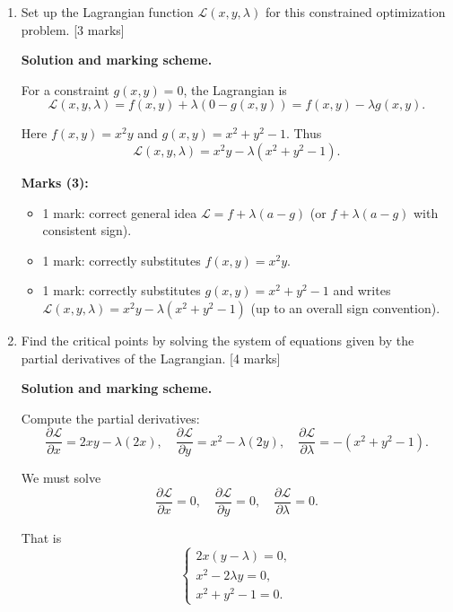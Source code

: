 \documentclass{article}
\begin{document}
\begin{enumerate}[label=(\alph*)]
    \item Set up the Lagrangian function $\mathcal{L}(x,y,\lambda)$ for this constrained optimization problem. [3 marks]

    \begin{mdframed}[linecolor=black, linewidth=1pt]
    \textbf{Solution and marking scheme.}

    For a constraint $g(x,y)=0$, the Lagrangian is
    \[
    \mathcal{L}(x,y,\lambda) = f(x,y) + \lambda (0 - g(x,y)) =  f(x,y) -\lambda g(x,y).
    \]
    
    Here $f(x,y)=x^2y$ and $g(x,y)=x^2+y^2-1$. Thus
    \[
    \mathcal{L}(x,y,\lambda)
    = x^2y - \lambda(x^2 + y^2 - 1).
    \]
    
    \textbf{Marks (3):}
    \begin{itemize}
      \item 1 mark: correct general idea $\mathcal{L}=f+\lambda(a-g)$ (or $f+\lambda(a-g)$ with consistent sign).
      \item 1 mark: correctly substitutes $f(x,y)=x^2y$.
      \item 1 mark: correctly substitutes $g(x,y)=x^2+y^2-1$ and writes $\mathcal{L}(x,y,\lambda)=x^2y-\lambda(x^2+y^2-1)$ (up to an overall sign convention).
    \end{itemize}
    \end{mdframed}

    \item Find the critical points by solving the system of equations given by the partial derivatives of the Lagrangian. [4 marks]

    \begin{mdframed}[linecolor=black, linewidth=1pt]
    \textbf{Solution and marking scheme.}

    Compute the partial derivatives:
    \[
    \frac{\partial\mathcal{L}}{\partial x}
    = 2xy - \lambda(2x),
    \quad
    \frac{\partial\mathcal{L}}{\partial y}
    = x^2 - \lambda(2y),
    \quad
    \frac{\partial\mathcal{L}}{\partial\lambda}
    = -(x^2 + y^2 -1).
    \]
    
    We must solve
    \[
    \frac{\partial\mathcal{L}}{\partial x}=0,\quad
    \frac{\partial\mathcal{L}}{\partial y}=0,\quad
    \frac{\partial\mathcal{L}}{\partial\lambda}=0.
    \]
    
    That is
    \[
    \begin{cases}
    2x(y - \lambda) = 0,\\[0.2em]
    x^2 - 2\lambda y = 0,\\[0.2em]
    x^2 + y^2 - 1 = 0.
    \end{cases}
    \]
    

\end{mdframed}
\end{enumerate}
\end{document}
